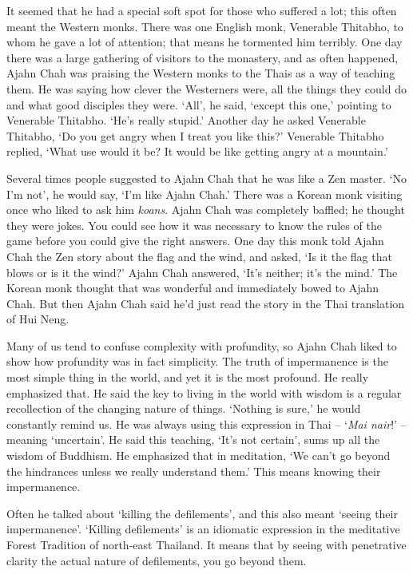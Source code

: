 It seemed that he had a special soft spot for those who suffered a lot; 
this often meant the Western monks. There was one English monk, 
Venerable Thitabho, to whom he gave a lot of attention; that means he
tormented him terribly. One day there was a large gathering of visitors
to the monastery, and as often happened, Ajahn Chah was praising the
Western monks to the Thais as a way of teaching them. He was saying how
clever the Westerners were, all the things they could do and what good
disciples they were. `All', he said, `except this one,' pointing to
Venerable Thitabho. `He's really stupid.' Another day he asked Venerable
Thitabho, `Do you get angry when I treat you like this?' Venerable
Thitabho replied, `What use would it be? It would be like getting angry
at a mountain.'

Several times people suggested to Ajahn Chah that he was like a Zen
master. `No I'm not', he would say, `I'm like Ajahn Chah.' There was a
Korean monk visiting once who liked to ask him \emph{koans}. Ajahn Chah
was completely baffled; he thought they were jokes. You could see how it
was necessary to know the rules of the game before you could give the
right answers. One day this monk told Ajahn Chah the Zen story about the
flag and the wind, and asked, `Is it the flag that blows or is it the
wind?' Ajahn Chah answered, `It's neither; it's the mind.' The Korean
monk thought that was wonderful and immediately bowed to Ajahn Chah. But
then Ajahn Chah said he'd just read the story in the Thai translation of
Hui Neng. 

Many of us tend to confuse complexity with profundity, so Ajahn Chah
liked to show how profundity was in fact simplicity. The truth of
impermanence is the most simple thing in the world, and yet it is the
most profound. He really emphasized that. He said the key to living in
the world with wisdom is a regular recollection of the changing nature
of things. `Nothing is sure,' he would constantly remind us. He was
always using this expression in Thai -- `\emph{Mai nair}!' -- meaning
`uncertain'. He said this teaching, `It's not certain', sums up all the
wisdom of Buddhism. He emphasized that in meditation, `We can't go
beyond the hindrances unless we really understand them.' This means
knowing their impermanence. 

Often he talked about `killing the defilements', and this also meant
`seeing their impermanence'. `Killing defilements' is an idiomatic
expression in the meditative Forest Tradition of north-east Thailand. It
means that by seeing with penetrative clarity the actual nature of
defilements, you go beyond them. 


